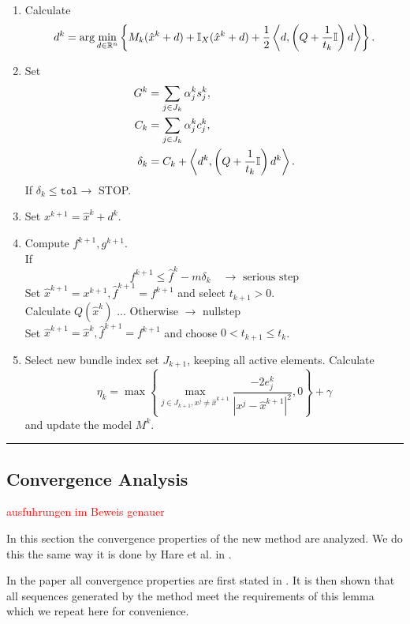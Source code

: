 \begin{enumerate}
	\item Calculate \[d^k = \arg \min_{d \in \mathbb{R}^n} \left\{ M_k(\hat{x}^k+d)+\mathbb{I}_X(\hat{x}^k+d)+\frac{1}{2}\left\langle d,\left(Q+\frac{1}{t_k}\mathbb{I}\right)d\right\rangle\right\}.\]
	\item Set %
		\begin{align*} 
		  G^k &= \sum_{j \in J_k}{\alpha_j^k s_j^k}, \\ %
			C_k &= \sum_{j \in J_k}{\alpha_j^k c_j^k}, \\
	    \delta_k &=  C_k + \Langle d^k,\left(Q+\frac{1}{t_k}\mathbb{I}\right)d^k\Rangle.
		\end{align*}
		If \(\delta_k \leq \mathtt{tol} \rightarrow \) STOP.
	\item Set \( x^{k+1} = \hat{x}^k + d^k \).
	\item Compute \(f^{k+1}, g^{k+1}\). \\
	If 
	\[f^{k+1} \leq \hat{f}^k - m\delta_k \quad \rightarrow \text{ serious step} \]
	Set \(\hat{x}^{k+1} = x^{k+1}, \hat{f}^{k+1} = f^{k+1}\) and select \(t_{k+1} > 0\). \\
	Calculate \(Q(\hat{x}^k)\) ...
	Otherwise \(\rightarrow\) nullstep \\
	Set \(\hat{x}^{k+1} = \hat{x}^k, \hat{f}^{k+1}=f^{k+1}\) and choose \(0 < t_{k+1} \leq t_k\). 	
	\item Select new bundle index set \(J_{k+1}\), keeping all active elements. Calculate 
	\[ \eta_k = \max{\left\{\max_{j \in J_{k+1}, x^j \neq \hat{x}^{k+1}}{\frac{-2e_j^k}{|x^j - \hat{x}^{k+1}|^2}, 0}\right\}}+\gamma  \]
	and update the model \(M^k\).
\end{enumerate}
\vspace{1ex}
\hrule

\vspace{1.5em}

\subsection{Convergence Analysis}

\textcolor{red}{ausfuhrungen im Beweis genauer}

In this section the convergence properties of the new method are analyzed. We do this the same way it is done by Hare et al. in \cite{Hare2016}.

In the paper all convergence properties are first stated in \cite[Lemma 5]{Hare2016}. It is then shown that all sequences generated by the method meet the requirements of this lemma which we repeat here for convenience.


